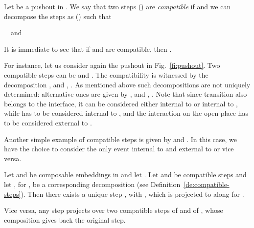 \documentclass{LMCS}
\begin{document}
\begin{defi}
  \label{de:compatible-steps}
  Let  be a pushout in .
We say that two steps  () are
  \emph{compatible} if  and we can
  decompose the steps as  ()
  such that
  \begin{center}
     \ \ and \ \
    
  \end{center}
\end{defi}

It is immediate to see that if  and  are compatible, then
.

For instance, let us consider again the pushout in
Fig.~\ref{fi:pushout}. Two compatible steps can be  and . The compatibility is
witnessed by the decomposition ,  and , . As mentioned above such decompositions are not uniquely determined: 
alternative ones are given by ,  and , .
Note that since transition  also belongs to the interface,
it can be considered either internal to  or internal to ,
while  has to be considered internal to , and the interaction
 on the open place  has to be considered external to .

Another simple example of compatible steps is given by 
and . In this case, we have the choice to consider the only
event  internal to  and external to  or vice versa.


\begin{lem}
  \label{le:compose-step}
  Let  and  be composable
  embeddings in  and let .  Let
   and  be compatible steps
  and let , for , be a
  corresponding decomposition (see
  Definition~\ref{de:compatible-steps}).
Then there exists a unique step , with , which is
  projected to  along  for .

  Vice versa, any step  projects over two
  compatible steps  of  and
   of , whose composition
  gives back the original step.
\end{lem}
\end{document}
